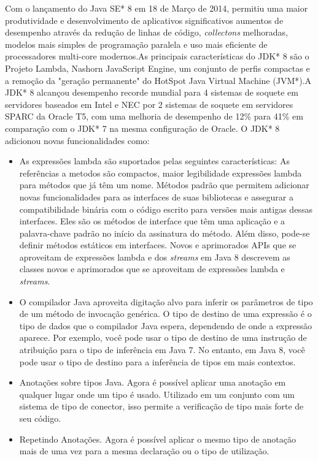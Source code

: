 Com o lançamento do Java SE* 8 em 18 de Março de 2014, permitiu uma maior produtividade e desenvolvimento de aplicativos significativos aumentos de desempenho através da redução de linhas de código, {\it collectons} melhoradas, modelos mais simples de programação paralela e uso mais eficiente de processadores multi-core modernos.As principais características do JDK* 8 são o Projeto Lambda, Nashorn JavaScript Engine, um conjunto de perfis compactas e a remoção da "geração permanente" do HotSpot Java Virtual Machine (JVM*).A JDK* 8 alcançou desempenho recorde mundial para 4 sistemas de soquete em servidores baseados em Intel e NEC por 2 sistemas de soquete em servidores SPARC da Oracle T5, com uma melhoria de desempenho de 12\% para 41\% em comparação com o JDK* 7 na mesma configuração de Oracle.
O JDK* 8 adicionou novas funcionalidades como:
  \begin{itemize}
  \item As expressões lambda são suportados pelas seguintes características: As referências a metodos são compactos, maior legibilidade expressões lambda para métodos que já têm um nome. Métodos padrão que permitem adicionar novas funcionalidades para as interfaces de suas bibliotecas e assegurar a compatibilidade binária com o código escrito para versões mais antigas dessas interfaces. Eles são os métodos de interface que têm uma aplicação e a palavra-chave padrão no início da assinatura do método. Além disso, pode-se definir métodos estáticos em interfaces. Novos e aprimorados APIs que se aproveitam de expressões lambda e dos {\it streams} em Java 8 descrevem as classes novos e aprimorados que se aproveitam de expressões lambda e {\it streams}.
  \item O compilador Java aproveita digitação alvo para inferir os parâmetros de tipo de um método de invocação genérica. O tipo de destino de uma expressão é o tipo de dados que o compilador Java espera, dependendo de onde a expressão aparece. Por exemplo, você pode usar o tipo de destino de uma instrução de atribuição para o tipo de inferência em Java 7. No entanto, em Java 8, você pode usar o tipo de destino para a inferência de tipos em mais contextos.
  \item Anotações sobre tipos Java. Agora é possível aplicar uma anotação em qualquer lugar onde um tipo é usado. Utilizado em um conjunto com um sistema de tipo de conector, isso permite a verificação de tipo mais forte de seu código.
  \item  Repetindo Anotações. Agora é possível aplicar o mesmo tipo de anotação mais de uma vez para a mesma declaração ou o tipo de utilização.\\
  \end{itemize}
